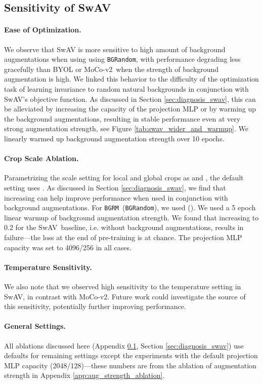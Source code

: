 \documentclass[twoside,11pt]{article}
\newcommand{\bgrm}{\texttt{BG\textunderscore RM}}
\newcommand{\bgrand}{\texttt{BG\textunderscore Random}}
\newcommand{\moco}{MoCo-v2}
\newcommand{\swav}{SwAV}
\begin{document}
\subsection{Sensitivity of SwAV} 
\label{app:swav_sensitive}

\paragraph{Ease of Optimization.} 
We observe that SwAV is more sensitive to high amount of background augmentations when using using \bgrand, with performance degrading less gracefully than BYOL or \moco~when the strength of background augmentation is high. We linked this behavior to the difficulty of the optimization task of learning invariance to random natural backgrounds in conjunction with SwAV's objective function. As discussed in Section \ref{sec:diagnosis_swav}, 
this can be alleviated by increasing the capacity of the projection MLP or by warming up the background augmentations, resulting in stable performance even at very strong augmentation strength, see Figure \ref{tab:swav_wider_and_warmup}.  We linearly warmed up background augmentation strength over 10 epochs.

\paragraph{Crop Scale Ablation.} 
Parametrizing the scale setting for local and global crops as  and , the default setting uses . As discussed in Section \ref{sec:diagnosis_swav}, we find that increasing  can help improve performance when used in conjunction with background augmentations. For \bgrm~(\bgrand), we used  (). We used a 5 epoch linear warmup of background augmentation strength. We found that increasing  to 0.2 for the \swav~baseline, i.e. without background augmentations, results in failure---the loss at the end of pre-training is at chance. The  projection MLP capacity was set to 4096/256 in all cases.

\paragraph{Temperature Sensitivity.} 
We also note that we observed high sensitivity to the temperature setting in SwAV, in contrast with \moco. Future work could investigate the source of this sensitivity, potentially further improving performance.

\paragraph{General Settings.} All ablations discussed here (Appendix \ref{app:swav_sensitive}, Section \ref{sec:diagnosis_swav}) use defaults for remaining settings except the experiments with the default projection MLP capacity (2048/128)---these numbers are from the ablation of augmentation strength in Appendix \ref{app:aug_strength_ablation}.
\end{document}
